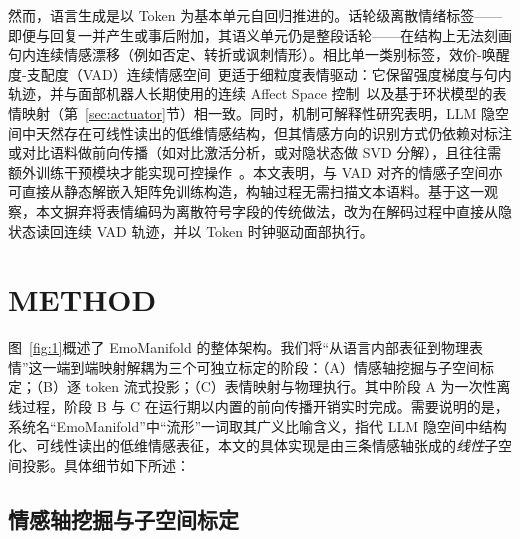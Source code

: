\documentclass[letterpaper, 10 pt, conference]{ieeeconf/ieeeconf}
\begin{document}
然而，语言生成是以 Token 为基本单元自回归推进的。话轮级离散情绪标签——即便与回复一并产生或事后附加，其语义单元仍是整段话轮——在结构上无法刻画句内连续情感漂移（例如否定、转折或讽刺情形）。相比单一类别标签，效价-唤醒度-支配度（VAD）连续情感空间~\cite{russell1977evidence,mohammad2018nrcvad}更适于细粒度表情驱动：它保留强度梯度与句内轨迹，并与面部机器人长期使用的连续 Affect Space 控制~\cite{breazeal2002designing}以及基于环状模型的表情映射（第~\ref{sec:actuator}节）相一致。同时，机制可解释性研究表明，LLM 隐空间中天然存在可线性读出的低维情感结构，但其情感方向的识别方式仍依赖对标注或对比语料做前向传播（如对比激活分析，或对隐状态做 SVD 分解），且往往需额外训练干预模块才能实现可控操作~\cite{tigges2024sentiment,reichman2026emotions}。本文表明，与 VAD 对齐的情感子空间亦可直接从静态解嵌入矩阵免训练构造，构轴过程无需扫描文本语料。基于这一观察，本文摒弃将表情编码为离散符号字段的传统做法，改为在解码过程中直接从隐状态读回连续 VAD 轨迹，并以 Token 时钟驱动面部执行。

\section{METHOD}
\label{sec:method}

图~\ref{fig:1}概述了 EmoManifold 的整体架构。我们将``从语言内部表征到物理表情''这一端到端映射解耦为三个可独立标定的阶段：（A）情感轴挖掘与子空间标定；（B）逐 token 流式投影；（C）表情映射与物理执行。其中阶段 A 为一次性离线过程，阶段 B 与 C 在运行期以内置的前向传播开销实时完成。需要说明的是，系统名``EmoManifold''中``流形''一词取其广义比喻含义，指代 LLM 隐空间中结构化、可线性读出的低维情感表征，本文的具体实现是由三条情感轴张成的\emph{线性}子空间投影。具体细节如下所述：

\subsection{情感轴挖掘与子空间标定}
\label{sec:axis_mining}
\end{document}
